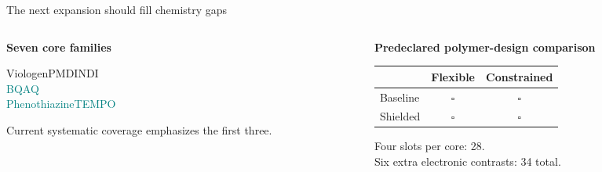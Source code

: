 \begin{frame}{The next expansion should fill chemistry gaps}
\begin{columns}[T]
\begin{column}{.42\textwidth}
\textbf{Seven core families}\par\medskip
\colorbox{soft}{\parbox{.92\linewidth}{\large Viologen\quad PMDI\quad NDI\\[.6em]\textcolor{teal}{BQ\quad AQ\\[.6em]Phenothiazine\quad TEMPO}}}
\par\medskip\small Current systematic coverage emphasizes the first three.
\end{column}
\begin{column}{.54\textwidth}
\centering\textbf{Predeclared polymer-design comparison}\par\medskip
\begin{tabular}{lcc}\toprule & Flexible & Constrained\\\midrule
Baseline & $\square$ & $\square$\\[.6em]
Shielded & $\square$ & $\square$\\\bottomrule\end{tabular}
\par\medskip\small Four slots per core: 28.\\Six extra electronic contrasts: 34 total.
\end{column}\end{columns}
\end{frame}

